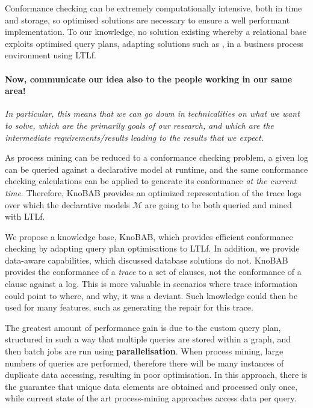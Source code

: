 

Conformance checking can be extremely computationally intensive, both in time and storage, so optimised solutions are necessary to ensure a well performant implementation. To our knowledge, no solution existing whereby a relational base exploits optimised query plans, adapting solutions such as \cite{BellatrecheKB21}, in a business process environment using LTLf.
\medskip


\paragraph*{Now, communicate our idea also to the people working in our same area!} \textit{In particular, this means that we can go down in technicalities on what we want to solve, which are the primarily goals of our research, and which are the intermediate requirements/results leading to the results that we expect.} 

As process mining can be reduced to a conformance checking problem, a given log can be queried against a declarative model at runtime, and the same conformance checking calculations can be applied to generate its conformance \emph{at the current time}. Therefore, KnoBAB provides an optimized representation of the trace logs over which the declarative models $\mathcal{M}$ are going to be both queried and mined with LTLf.

We propose a knowledge base, KnoBAB, which provides efficient conformance checking by adapting query plan optimisations \cite{BellatrecheKB21} to LTLf. In addition, we provide data-aware capabilities, which discussed database solutions do not. KnoBAB provides the conformance of a \emph{trace} to a set of clauses, not the conformance of a clause against a log. This is more valuable in scenarios where trace information could point to where, and why, it was a deviant. Such knowledge could then be used for many features, such as generating the repair for this trace.
\medskip
 

The greatest amount of performance gain is due to the custom query plan, structured in such a way that multiple queries are stored within a graph, and then batch jobs are run using \textbf{parallelisation}. When process mining, large numbers of queries are performed, therefore there will be many instances of duplicate data accessing, resulting in poor optimisation. In this approach, there is the guarantee that unique data elements are obtained and processed only once, while current state of the art process-mining approaches access data per query. 
